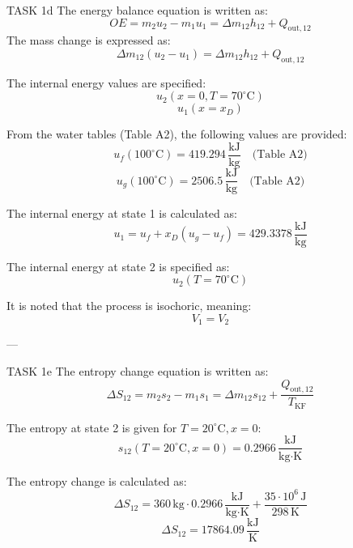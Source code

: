 TASK 1d  
The energy balance equation is written as:  
\[
OE = m_2 u_2 - m_1 u_1 = \Delta m_{12} h_{12} + Q_{\text{out},12}
\]  
The mass change is expressed as:  
\[
\Delta m_{12} (u_2 - u_1) = \Delta m_{12} h_{12} + Q_{\text{out},12}
\]  

The internal energy values are specified:  
\[
u_2 (x = 0, T = 70^\circ\text{C})
\]  
\[
u_1 (x = x_D)
\]  

From the water tables (Table A2), the following values are provided:  
\[
u_f (100^\circ\text{C}) = 419.294 \, \frac{\text{kJ}}{\text{kg}} \quad \text{(Table A2)}
\]  
\[
u_g (100^\circ\text{C}) = 2506.5 \, \frac{\text{kJ}}{\text{kg}} \quad \text{(Table A2)}
\]  

The internal energy at state 1 is calculated as:  
\[
u_1 = u_f + x_D (u_g - u_f) = 429.3378 \, \frac{\text{kJ}}{\text{kg}}
\]  

The internal energy at state 2 is specified as:  
\[
u_2 (T = 70^\circ\text{C})
\]  

It is noted that the process is isochoric, meaning:  
\[
V_1 = V_2
\]  

---

TASK 1e  
The entropy change equation is written as:  
\[
\Delta S_{12} = m_2 s_2 - m_1 s_1 = \Delta m_{12} s_{12} + \frac{Q_{\text{out},12}}{T_{\text{KF}}}
\]  

The entropy at state 2 is given for \( T = 20^\circ\text{C}, x = 0 \):  
\[
s_{12} (T = 20^\circ\text{C}, x = 0) = 0.2966 \, \frac{\text{kJ}}{\text{kg·K}}
\]  

The entropy change is calculated as:  
\[
\Delta S_{12} = 360 \, \text{kg} \cdot 0.2966 \, \frac{\text{kJ}}{\text{kg·K}} + \frac{35 \cdot 10^6 \, \text{J}}{298 \, \text{K}}
\]  
\[
\Delta S_{12} = 17864.09 \, \frac{\text{kJ}}{\text{K}}
\]